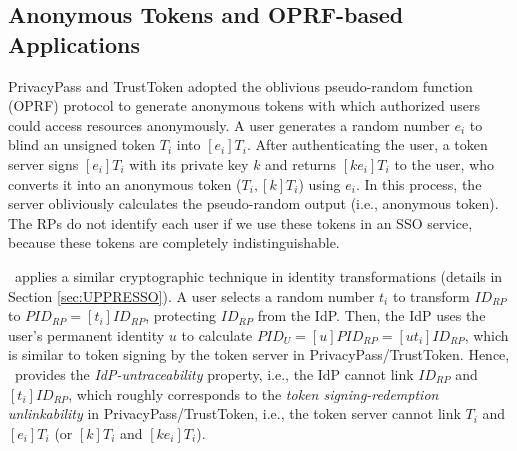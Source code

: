 \subsection{Anonymous Tokens and OPRF-based Applications}
\label{sec:related}

PrivacyPass and TrustToken \cite{privacypass,trusttoken} adopted the oblivious pseudo-random function (OPRF) protocol \cite{oprf-proved,voprf-proved,oprf-bitcoin-wallet} to generate anonymous tokens with which authorized users could access resources anonymously.
A user generates a random number $e_i$ to blind an unsigned token $T_i$ into $[e_i]T_i$. After authenticating the user, a token server signs $[e_i]T_i$ with its private key $k$ and returns $[k e_i]T_i$ to the user, who converts it into an anonymous token  ($T_i, [k]T_i$) using $e_i$. In this process, the server obliviously calculates the pseudo-random output (i.e., anonymous token).
The RPs do not identify each user if we use these tokens in an SSO service, because these tokens are completely indistinguishable.

\usso\ applies a similar cryptographic technique in identity transformations  (details in Section \ref{sec:UPPRESSO}).
 A user selects a random number $t_i$ to transform $ID_{RP}$ to $PID_{RP} = [t_i]ID_{RP}$, protecting $ID_{RP}$ from the IdP.
Then, the IdP uses the user's permanent identity $u$ to calculate $PID_U = [u]PID_{RP} = [ut_i]ID_{RP}$,
which is similar to token signing by the token server in PrivacyPass/TrustToken. Hence, \usso\ provides the \emph{IdP-untraceability} property, i.e., the IdP cannot link $ID_{RP}$ and $[t_i]ID_{RP}$, which roughly corresponds to the {\em token signing-redemption unlinkability} in PrivacyPass/TrustToken, i.e., the token server cannot link $T_i$ and $[e_i]T_i$ (or $[k]T_i$ and $[ke_i]T_i$). %

